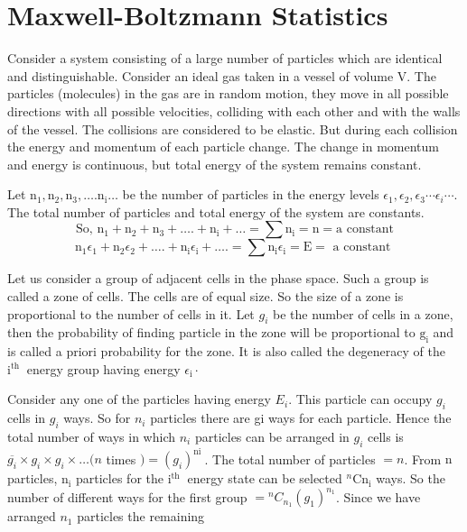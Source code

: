 \section{Maxwell-Boltzmann Statistics}
Consider a system consisting of a large number of particles which are identical and distinguishable. Consider an ideal gas taken in a vessel of volume V. The particles (molecules) in the gas are in random motion, they move in all possible directions with all possible velocities, colliding with each other and with the walls of the vessel. The collisions are considered to be elastic. But during each collision the energy and momentum of each particle change. The change in momentum and energy is continuous, but total energy of the system remains constant.\\
\par Let $\mathrm{n}_{1}, \mathrm{n}_{2}, \mathrm{n}_{3}, \ldots . \mathrm{n}_{\mathrm{i}} \ldots$ be the number of particles in the energy levels $\epsilon_{1}, \epsilon_{2}, \epsilon_{3} \cdots \epsilon_{i} \cdots$. The total number of particles and total energy of the system are constants.
\begin{equation}
\text{So, }\mathrm{n}_{1}+\mathrm{n}_{2}+\mathrm{n}_{3}+\ldots .+\mathrm{n}_{\mathrm{i}}+\ldots=\sum \mathrm{n}_{\mathrm{i}}=\mathrm{n}=\mathrm{a}\text{ constant}\label{SME-01}
\end{equation}
\begin{equation}
\mathrm{n}_{1} \epsilon_{1}+\mathrm{n}_{2} \epsilon_{2}+\ldots .+\mathrm{n}_{\mathrm{i}} \epsilon_{\mathrm{i}}+\ldots .=\sum \mathrm{n}_{\mathrm{i}} \epsilon_{\mathrm{i}}=\mathrm{E}=\text { a constant }\label{SME-02}
\end{equation}
\par Let us consider a group of adjacent cells in the phase space. Such a group is called a zone of cells. The cells are of equal size. So the size of a zone is proportional to the number of cells in it. Let $g_{i}$ be the number of cells in a zone, then the probability of finding particle in the zone will be proportional to $\mathrm{g}_{\mathrm{i}}$ and is called a priori probability for the zone. It is also called the degeneracy of the $\mathrm{i}^{\text {th }}$ energy group having energy $\epsilon_{\mathrm{i}} \cdot$\\
\par Consider any one of the particles having energy $E_{i}$. This particle can occupy $g_{i}$ cells in $g_{i}$ ways. So for $n_{i}$ particles there are gi ways for each particle. Hence the total number of ways in which $n_{i}$ particles can be arranged in $g_{i}$ cells is $\overline{g_{i}} \times g_{i} \times g_{i} \times \ldots(n$ times $)=\left(g_{i}\right)^{\text {ni }}$. The total number of particles $=n$. From $\mathrm{n}$ particles, $\mathrm{n}_{\mathrm{i}}$ particles for the $\mathrm{i}^{\text {th }}$ energy state can be selected ${ }^{n} \mathrm{Cn}_{\mathrm{i}}$ ways. So the number of different ways for the first group $={ }^{n} C_{n_{1}}\left(g_{1}\right)^{n_{1}}$. Since we have arranged $n_{1}$ particles the remaining\\\\
